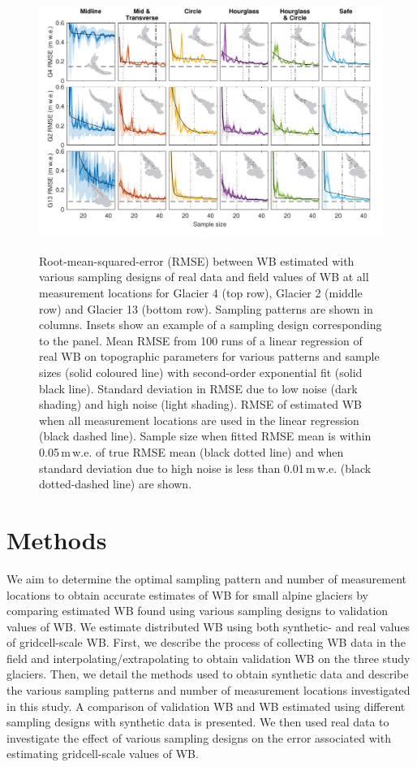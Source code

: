 \documentclass[twocolumn,letterpaper]{igs}
\begin{document}
\begin{figure}
	\centering
	\includegraphics[width =\textwidth]{DataObsWB.pdf}\\
	\caption{Root-mean-squared-error (RMSE) between WB estimated with various sampling designs of real data and field values of WB at all measurement locations for Glacier 4 (top row), Glacier 2 (middle row) and Glacier 13 (bottom row). Sampling patterns are shown in columns. Insets show an example of a sampling design corresponding to the panel. Mean RMSE from 100 runs of a linear regression of real WB on topographic parameters for various patterns and sample sizes (solid coloured line) with second-order exponential fit (solid black line). Standard deviation in RMSE due to low noise (dark shading) and high noise (light shading). RMSE of estimated WB when all measurement locations are used in the linear regression (black dashed line). Sample size when fitted RMSE mean is within 0.05\,m\,w.e. of true RMSE mean (black dotted line) and when standard deviation due to high noise is less than 0.01\,m\,w.e. (black dotted-dashed line) are shown.}
	\label{fig:RealObsWB}
\end{figure}


\section{Methods}

We aim to determine the optimal sampling pattern and number of measurement locations to obtain accurate estimates of WB for small alpine glaciers by comparing estimated WB found using various sampling designs to validation values of WB. We estimate distributed WB using both synthetic- and real values of gridcell-scale WB. First, we describe the process of collecting WB data in the field and interpolating/extrapolating to obtain validation WB on the three study glaciers. Then, we detail the methods used to obtain synthetic data and describe the various sampling patterns and number of measurement locations investigated in this study. A comparison of validation WB and WB estimated using different sampling designs with synthetic data is presented. We then used real data to investigate the effect of various sampling designs on the error associated with estimating gridcell-scale values of WB.
\end{document}
